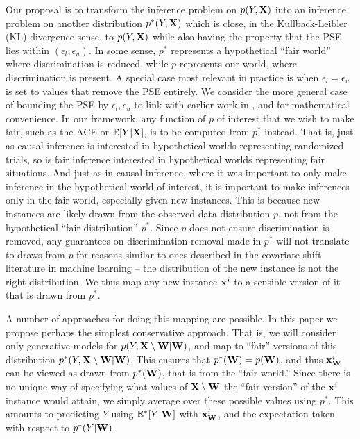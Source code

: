 \documentclass[letterpaper]{article} %
\newcommand{\citep}{\cite}
\begin{document}
Our proposal is to transform the inference problem on $p(Y,{\bf X})$ into an inference problem on another distribution $p^*(Y,{\bf X})$ which is close, in the Kullback-Leibler (KL)
divergence sense, to $p(Y,{\bf X})$ while also having the property that the PSE lies within $(\epsilon_l,\epsilon_u)$.  In some sense, $p^*$ represents a hypothetical ``fair world'' where discrimination is reduced, while $p$ represents our world, where discrimination is present.  A special case most relevant in practice is when $\epsilon_l = \epsilon_u$ is set to values that remove the PSE entirely.  We consider the more general case of bounding the PSE by $\epsilon_l,\epsilon_u$ to link with earlier work in \citep{Zhang17causal}, and for mathematical convenience.  In our framework, any function of $p$ of interest that we wish to make fair, such as the ACE or $\mathbb{E}[Y | {\bf X}]$, is to be computed from $p^*$ instead.  That is, just as causal inference is interested in hypothetical worlds representing randomized trials, so is fair inference interested in hypothetical worlds representing fair situations. And just as in causal inference, where it was important to only make inference in the hypothetical world of interest, it is important to make inferences only in the fair world, especially given new instances.  This is because new instances are likely drawn from the observed data distribution $p$, not from the hypothetical ``fair distribution'' $p^*$.  Since $p$ does not ensure discrimination is removed, any guarantees on discrimination removal made in $p^*$ will not translate to draws from $p$ for reasons similar to ones described in the covariate shift literature in machine learning -- the distribution of the new instance is not the right distribution.  We thus map any new instance ${\bf x}^i$ to a sensible version of it that is drawn from $p^*$.

A number of approaches for doing this mapping are possible.  In this paper we propose perhaps the simplest conservative approach.  That is, we will consider only generative
models for $p(Y,{\bf X}\setminus{\bf W}|{\bf W})$, and map to ``fair'' versions of this distribution $p^*(Y,{\bf X}\setminus{\bf W}|{\bf W})$.  This ensures that $p^*({\bf W})=p({\bf W})$,
and thus
${\bf x}^i_{\bf W}$ can be viewed as drawn from $p^*({\bf W})$, that is from the ``fair world.''
Since there is no unique way of specifying what values of ${\bf X}\setminus{\bf W}$ the ``fair version'' of the ${\bf x}^i$ instance would attain, we simply average over these possible values using $p^*$.  This amounts to predicting $Y$ using $\mathbb{E}^*[Y | {\bf W}]$ with ${\bf x}^i_{\bf W}$, and the expectation taken with respect to
$p^*(Y | {\bf W})$.
\end{document}
